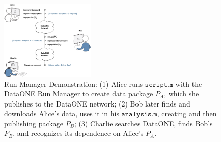 \documentclass[a4paper]{llncs}
\newcommand{\mytt}[1]{\ensuremath{\mathtt{#1}}}
\begin{document}


\begin{figure}[t] \centering \includegraphics[width=0.4\textwidth]{figs/alice-bob-charlie-sequence-crop} \caption{Run Manager Demonstration: (1) Alice runs \mytt{script.m} with the DataONE Run Manager to create data package $P_A$, which she publishes to the DataONE network; (2) Bob later finds and downloads Alice's data, uses it in his \mytt{analysis.m}, creating and then publishing package $P_B$; (3) Charlie searches DataONE, finds Bob's $P_B$, and recognizes its dependence on Alice's $P_A$.}  \label{fig0} \end{figure}
\end{document}
